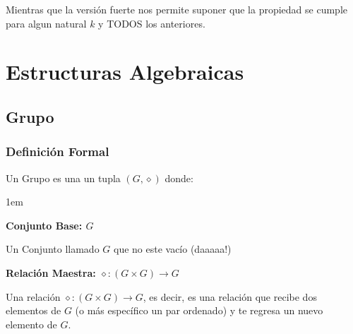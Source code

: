\documentclass[12pt, fleqn]{report}                             %
\newenvironment{Indentation}[1][0.75em]                         %
    {\begin{adjustwidth}{#1}{}}                                     %
    {\end{adjustwidth}}                                             %
\begin{document}
            Mientras que la versión fuerte nos permite suponer que la propiedad se cumple para algun natural
            $k$ y TODOS los anteriores.










    \chapter{Estructuras Algebraicas}
        \clearpage


        \clearpage
        \section{Grupo}

            \subsection{Definición Formal}

                Un Grupo es una un tupla $(G, \diamond)$ donde:
                \begin{Indentation}[1em]
                \begin{itemize}
                \small{
                    
                    \item
                        \textbf{Conjunto Base: $G$}

                        Un Conjunto llamado $G$ que no este vacío (daaaaa!)

                    \item
                        \textbf{Relación Maestra: $\diamond: (G \times  G) \to G$}

                        Una relación $\diamond: (G \times  G) \to G$, es decir, es una relación
                        que recibe dos elementos de $G$ (o más específico un par ordenado) y te
                        regresa un nuevo elemento de $G$.
                }
                \end{itemize}
                \end{Indentation}
\end{document}
